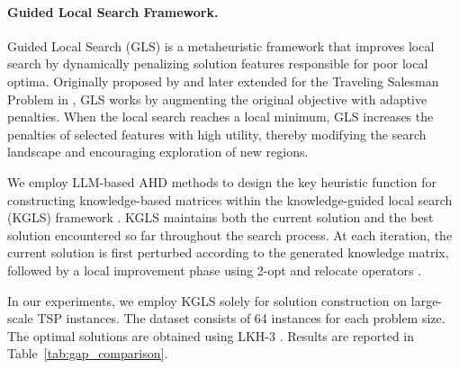 \documentclass[sigconf,anonymous]{aamas}
\begin{document}
\paragraph{Guided Local Search Framework.}
Guided Local Search (GLS) is a metaheuristic framework that improves local search by dynamically penalizing solution features responsible for poor local optima. Originally proposed by \cite{voudouris1996pcs} and later extended for the Traveling Salesman Problem in \cite{voudouris1999gls}, GLS works by augmenting the original objective with adaptive penalties. When the local search reaches a local minimum, GLS increases the penalties of selected features with high utility, thereby modifying the search landscape and encouraging exploration of new regions.

We employ LLM-based AHD methods to design the key heuristic function for constructing knowledge-based matrices within the knowledge-guided local search (KGLS) framework \cite{arnold2019kgls}. KGLS maintains both the current solution and the best solution encountered so far throughout the search process. At each iteration, the current solution is first perturbed according to the generated knowledge matrix, followed by a local improvement phase using 2-opt and relocate operators \cite{sengupta2019}.

In our experiments, we employ KGLS solely for solution construction on large-scale TSP instances. The dataset consists of 64 instances for each problem size. The optimal solutions are obtained using LKH-3 \citep{helsgaun2017lkh3}. Results are reported in Table~\ref{tab:gap_comparison}.
\end{document}
